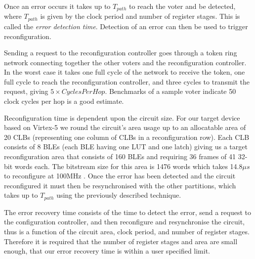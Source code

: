 \documentclass[12pt,final,oneside,a4paper]{dwThesis} %
\begin{document}
   Once an error occurs it takes up to $T_{path}$ to reach the voter and be
   detected, where $T_{path}$ is given by the clock period and number of
   register stages. This is called the \textit{error detection time}. Detection
   of an error can then be used to trigger reconfiguration.

   Sending a request to the reconfiguration controller goes through a token
   ring network connecting together the other voters and the reconfiguration
   controller. In the worst case it takes one full cycle of the network to
   receive the token, one full cycle to reach the reconfiguration controller,
   and three cycles to transmit the request, giving $5\times Cycles Per Hop$.
   Benchmarks of a sample voter indicate 50 clock cycles per hop is a good
   estimate.

   Reconfiguration time is dependent upon the circuit size.
   For our target device based on Virtex-5 we round the circuit's area usage up
   to an allocatable area of 20 \glspl{CLB} (representing one column of \glspl{CLB} 
   in a reconfiguration row). Each \gls{CLB} consists of 8 \glspl{BLE} (each
   \gls{BLE} having one \gls{LUT} and one latch) giving us a target 
   reconfiguration area that consists of 160 \glspl{BLE} and requiring 36
   frames of 41 32-bit words each. The bitstream size for this area is 1476
   words which takes 14.8$\mu{}s$ to reconfigure at 100MHz
   \cite{XilinxConfigurationUG}.  Once the error has been detected and the
   circuit reconfigured it must then be resynchronised with the other
   partitions, which takes up to $T_{path}$ using the previously described
   technique.

   The error recovery time consists of the time to detect the error, send a
   request to the configuration controller, and then reconfigure and
   resynchronise the circuit, thus is a function of the circuit area, clock
   period, and number of register stages. Therefore it is required that the
   number of register stages and area are small enough,
   that our error recovery time is within a user specified limit.
\end{document}
